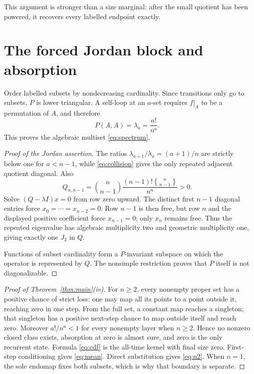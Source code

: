 \documentclass[a4paper,10pt]{amsart}
\theoremstyle{remark}
\newcommand{\Stir}[2]{\genfrac\{\}{0pt}{}{#1}{#2}}
\begin{document}
This argument is stronger than a size marginal: after the small quotient has
been powered, it recovers every labelled endpoint exactly.

\section{The forced Jordan block and absorption}

Order labelled subsets by nondecreasing cardinality.  Since transitions only
go to subsets, $P$ is lower triangular.  A self-loop at an $a$-set requires
$f|_A$ to be a permutation of $A$, and therefore
\begin{equation}\label{eq:diagonal}
                         P(A,A)=\lambda_a=\frac{a!}{n^a}.
\end{equation}
This proves the algebraic multiset \eqref{eq:spectrum}.

\begin{proof}[Proof of the Jordan assertion]
The ratios $\lambda_{a+1}/\lambda_a=(a+1)/n$ are strictly below one for
$a<n-1$, while \eqref{eq:collision} gives the only repeated adjacent
quotient diagonal.  Also
\[
 Q_{n,n-1}=\binom n{n-1}\frac{(n-1)!\Stir n{n-1}}{n^n}>0.
\]
Solve $(Q-\lambda I)x=0$ from row zero upward.  The distinct first $n-1$
diagonal entries force $x_0=\cdots=x_{n-2}=0$.  Row $n-1$ is then free, but
row $n$ and the displayed positive coefficient force $x_{n-1}=0$; only
$x_n$ remains free.  Thus the repeated eigenvalue has algebraic multiplicity
two and geometric multiplicity one, giving exactly one $J_2$ in $Q$.

Functions of subset cardinality form a $P$-invariant subspace on which the
operator is represented by $Q$.  The nonsimple restriction proves that $P$
itself is not diagonalizable.
\end{proof}

\begin{proof}[Proof of Theorem~\ref{thm:main}(iv)]
For $n\ge2$, every nonempty proper set has a positive chance of strict loss:
one may map all its points to a point outside it, reaching zero in one step.
From the full set, a constant map reaches a singleton; that singleton has a
positive next-step chance to map outside itself and reach zero.  Moreover
$a!/n^a<1$ for every nonempty layer when $n\ge2$.  Hence no nonzero closed
class exists, absorption at zero is almost sure, and zero is the only
recurrent state.  Formula
\eqref{eq:cdf} is the all-time kernel with final size zero.  First-step
conditioning gives \eqref{eq:mean}.  Direct substitution gives
\eqref{eq:n2}.  When $n=1$, the sole endomap fixes both subsets, which is why
that boundary is separate.
\end{proof}
\end{document}

